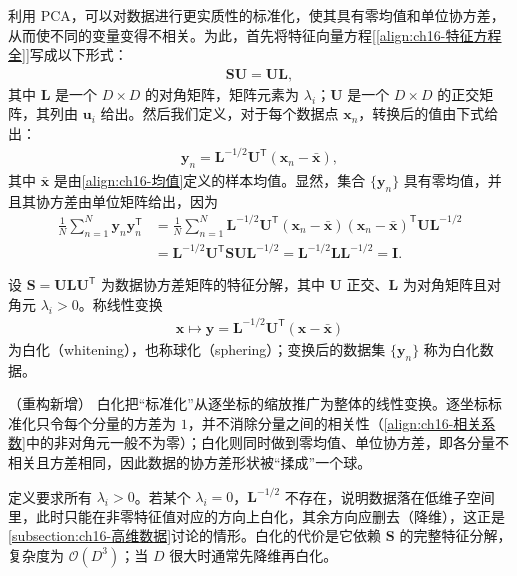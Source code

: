 \documentclass[../../main.tex]{subfiles}
\begin{document}
利用 PCA，可以对数据进行更实质性的标准化，使其具有零均值和单位协方差，从而使不同的变量变得不相关。为此，首先将特征向量方程[\eqref{align:ch16-特征方程全}]写成以下形式：
\begin{align}
  \bm{S}\bm{U}=\bm{U}\bm{L},
  \label{align:ch16-特征分解}
\end{align}
其中 $\bm{L}$ 是一个 $D\times D$ 的对角矩阵，矩阵元素为 $\lambda_i$；$\bm{U}$ 是一个 $D\times D$ 的正交矩阵，其列由 $\bm{u}_i$ 给出。然后我们定义，对于每个数据点 $\bm{x}_n$，转换后的值由下式给出：
\begin{align}
  \bm{y}_n=\bm{L}^{-1/2}\bm{U}^{\mathsf T}(\bm{x}_n-\bar{\bm{x}}),
  \label{align:ch16-白化}
\end{align}
其中 $\bar{\bm{x}}$ 是由\eqref{align:ch16-均值}定义的样本均值。显然，集合 $\{\bm{y}_n\}$ 具有零均值，并且其协方差由单位矩阵给出，因为
\begin{align}
  \frac{1}{N}\sum_{n=1}^{N}\bm{y}_n\bm{y}_n^{\mathsf T}&=\frac{1}{N}\sum_{n=1}^{N}\bm{L}^{-1/2}\bm{U}^{\mathsf T}(\bm{x}_n-\bar{\bm{x}})(\bm{x}_n-\bar{\bm{x}})^{\mathsf T}\bm{U}\bm{L}^{-1/2}\nonumber\\
  &=\bm{L}^{-1/2}\bm{U}^{\mathsf T}\bm{S}\bm{U}\bm{L}^{-1/2}=\bm{L}^{-1/2}\bm{L}\bm{L}^{-1/2}=\bm{I}.
  \label{align:ch16-白化协方差}
\end{align}

\begin{definition}[白化]\label{definition:ch16-白化}
设 $\bm{S}=\bm{U}\bm{L}\bm{U}^{\mathsf T}$ 为数据协方差矩阵的特征分解，其中 $\bm{U}$ 正交、$\bm{L}$ 为对角矩阵且对角元 $\lambda_i>0$。称线性变换
\begin{align*}
  \bm{x}\mapsto\bm{y}=\bm{L}^{-1/2}\bm{U}^{\mathsf T}(\bm{x}-\bar{\bm{x}})
\end{align*}
为白化（whitening），也称球化（sphering）；变换后的数据集 $\{\bm{y}_n\}$ 称为白化数据。
\end{definition}

\begin{remark}（重构新增）
白化把“标准化”从逐坐标的缩放推广为整体的线性变换。逐坐标标准化只令每个分量的方差为 $1$，并不消除分量之间的相关性（\eqref{align:ch16-相关系数}中的非对角元一般不为零）；白化则同时做到零均值、单位协方差，即各分量不相关且方差相同，因此数据的协方差形状被“揉成”一个球。

定义要求所有 $\lambda_i>0$。若某个 $\lambda_i=0$，$\bm{L}^{-1/2}$ 不存在，说明数据落在低维子空间里，此时只能在非零特征值对应的方向上白化，其余方向应删去（降维），这正是\cref{subsection:ch16-高维数据}讨论的情形。白化的代价是它依赖 $\bm{S}$ 的完整特征分解，复杂度为 $\mathcal{O}(D^3)$；当 $D$ 很大时通常先降维再白化。
\end{remark}
\end{document}
